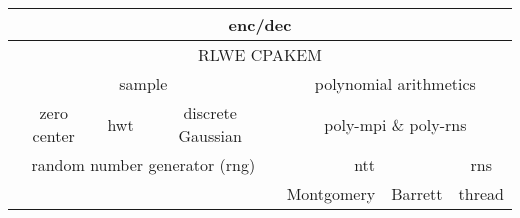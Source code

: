 \documentclass[preview]{standalone}
\begin{document}
\begin{tabular}{|c|c|c|c|c|c|}
\hline
\multicolumn{6}{|c|}{enc/dec}\\
\hline
\multicolumn{6}{|c|}{RLWE CPAKEM}\\
\hline
\multicolumn{3}{|c|}{sample}&\multicolumn{3}{|c|}{polynomial arithmetics}\\
\hline
zero center&hwt&discrete Gaussian&\multicolumn{3}{c|}{poly-mpi \& poly-rns}\\
\hline
\multicolumn{3}{|c|}{random number generator (rng)}&\multicolumn{2}{|c|}{ntt}&rns\\
\hline
\multicolumn{3}{c|}{}&Montgomery&Barrett&thread\\
\cline{4-6}
\end{tabular}
\end{document}
